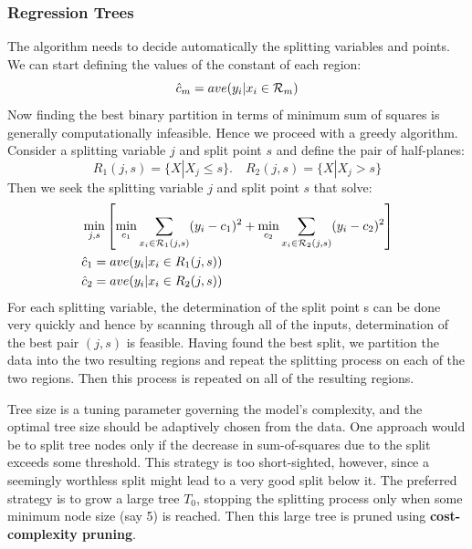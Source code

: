 \documentclass[12pt, letterpaper]{article}
\theoremstyle{definition}
\begin{document}
\subsubsection{Regression Trees}
The algorithm needs to decide automatically the splitting variables and points. We can start defining the values of the constant of each region:
\begin{equation}
\hat{c}_m = ave(y_i|x_i \in \CMcal{R}_m)
\end{equation}
Now finding the best binary partition in terms of minimum sum of squares is generally computationally infeasible. Hence we proceed with a greedy algorithm. Consider a splitting variable $j$ and split point $s$ and define the pair of half-planes:
\begin{equation}
R_1(j,s) = \{X|X_j \le s \}. \quad R_2(j,s) = \{X|X_j > s \}
\end{equation}
Then we seek the splitting variable $j$ and split point $s$ that solve:
\begin{equation}
\begin{aligned}
&\min_{j,s}\left[ \min_{c_1} \sum_{x_i \in \CMcal{R}_1(j,s)}  (y_i-c_1)^2 + \min_{c_2} \sum_{x_i \in \CMcal{R}_2(j,s)}  (y_i-c_2)^2\right]\\
&\hat{c}_1 = ave (y_i|x_i \in R_1(j,s)) \\
&\hat{c}_2 = ave (y_i|x_i \in R_2(j,s)) 
\end{aligned}
\end{equation}
For each splitting variable, the determination of the split point s can be done very quickly and hence by scanning through all of the inputs, determination of the best pair $(j, s)$ is feasible. Having found the best split, we partition the data into the two resulting regions and repeat the splitting process on each of the two regions. Then this process is repeated on all of the resulting regions.


Tree size is a tuning parameter governing the model's complexity, and the optimal tree size should be adaptively chosen from the data. One approach would be to split tree nodes only if the decrease in sum-of-squares due to the split exceeds some threshold. This strategy is too short-sighted, however, since a seemingly worthless split might lead to a very good split below it.
The preferred strategy is to grow a large tree $T_0$, stopping the splitting process only when some minimum node size (say 5) is reached. Then this large tree is pruned using \textbf{cost-complexity pruning}.
\end{document}
